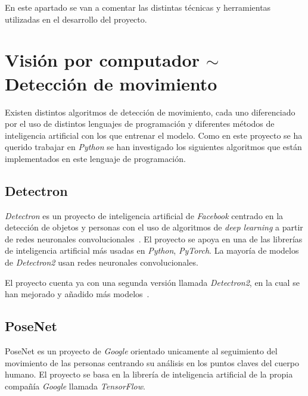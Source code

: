 
En este apartado se van a comentar las distintas técnicas y herramientas utilizadas en el desarrollo del proyecto.

\section{Visión por computador $\sim$ Detección de movimiento}
Existen distintos algoritmos de detección de movimiento, cada uno diferenciado por el uso de distintos lenguajes de programación y diferentes métodos de inteligencia artificial con los que entrenar el modelo. Como en este proyecto se ha querido trabajar en \textit{Python} se han investigado los siguientes algoritmos que están implementados en este lenguaje de programación. 

\subsection{Detectron}\label{dectectron}
\textit{Detectron} es un proyecto de inteligencia artificial de \textit{Facebook} centrado en la detección de objetos y personas con el uso de algoritmos de \textit{deep learning} a partir de redes neuronales convolucionales~\cite{Detectron2018}. El proyecto se apoya en una de las librerías de inteligencia artificial más usadas en \textit{Python}, \textit{PyTorch}. La mayoría de modelos de \textit{Detectron2} usan redes neuronales convolucionales.

El proyecto cuenta ya con una segunda versión llamada \textit{Detectron2}, en la cual se han mejorado y añadido más modelos~\cite{wu2019detectron2}.


\subsection{PoseNet}
PoseNet es un proyecto de \textit{Google} orientado unicamente al seguimiento del movimiento de las personas centrando su análisis en los puntos claves del cuerpo humano. El proyecto se basa en la librería de inteligencia artificial de la propia compañía \textit{Google} llamada \textit{TensorFlow}.


